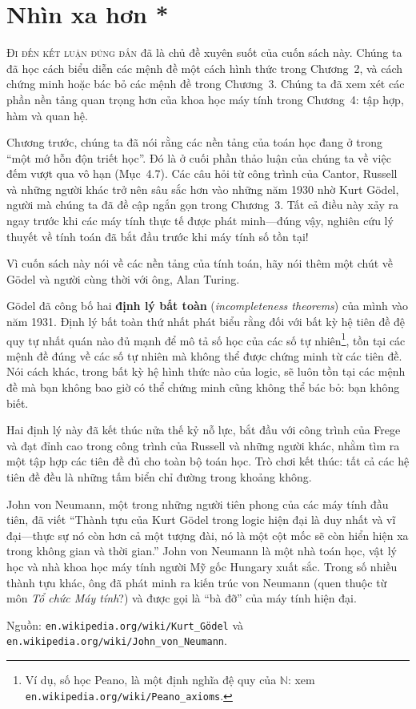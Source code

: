 \chapter{Nhìn xa hơn *}

\textsc{Đi đến kết luận đúng đắn} đã là chủ đề xuyên suốt của cuốn sách này. Chúng ta đã học cách biểu diễn các mệnh đề một cách hình thức trong Chương~2, và cách chứng minh hoặc bác bỏ các mệnh đề trong Chương~3. Chúng ta đã xem xét các phần nền tảng quan trọng hơn của khoa học máy tính trong Chương~4: tập hợp, hàm và quan hệ.

Chương trước, chúng ta đã nói rằng các nền tảng của toán học đang ở trong ``một mớ hỗn độn triết học''. Đó là ở cuối phần thảo luận của chúng ta về việc đếm vượt qua vô hạn (Mục~4.7). Các câu hỏi từ công trình của Cantor, Russell và những người khác trở nên sâu sắc hơn vào những năm 1930 nhờ Kurt Gödel, người mà chúng ta đã đề cập ngắn gọn trong Chương~3. Tất cả điều này xảy ra ngay trước khi các máy tính thực tế được phát minh---đúng vậy, nghiên cứu lý thuyết về tính toán đã bắt đầu trước khi máy tính số tồn tại!

Vì cuốn sách này nói về các nền tảng của tính toán, hãy nói thêm một chút về Gödel và người cùng thời với ông, Alan Turing.

Gödel đã công bố hai \textbf{định lý bất toàn} (\textit{incompleteness theorems}) của mình vào năm 1931. Định lý bất toàn thứ nhất phát biểu rằng đối với bất kỳ hệ tiên đề đệ quy tự nhất quán nào đủ mạnh để mô tả số học của các số tự nhiên\footnote{Ví dụ, số học Peano, là một định nghĩa đệ quy của $\mathbb{N}$: xem \texttt{en.wikipedia.org/wiki/Peano\_axioms}.}, tồn tại các mệnh đề đúng về các số tự nhiên mà không thể được chứng minh từ các tiên đề. Nói cách khác, trong bất kỳ hệ hình thức nào của logic, sẽ luôn tồn tại các mệnh đề mà bạn không bao giờ có thể chứng minh cũng không thể bác bỏ: bạn không biết.

Hai định lý này đã kết thúc nửa thế kỷ nỗ lực, bắt đầu với công trình của Frege và đạt đỉnh cao trong công trình của Russell và những người khác, nhằm tìm ra một tập hợp các tiên đề đủ cho toàn bộ toán học. Trò chơi kết thúc: tất cả các hệ tiên đề đều là những tấm biển chỉ đường trong khoảng không.

\begin{infobox}
John von Neumann, một trong những người tiên phong của các máy tính đầu tiên, đã viết ``Thành tựu của Kurt Gödel trong logic hiện đại là duy nhất và vĩ đại---thực sự nó còn hơn cả một tượng đài, nó là một cột mốc sẽ còn hiển hiện xa trong không gian và thời gian.'' John von Neumann là một nhà toán học, vật lý học và nhà khoa học máy tính người Mỹ gốc Hungary xuất sắc. Trong số nhiều thành tựu khác, ông đã phát minh ra kiến trúc von Neumann (quen thuộc từ môn \textit{Tổ chức Máy tính}?) và được gọi là ``bà đỡ'' của máy tính hiện đại.

\medskip
\noindent Nguồn: \texttt{en.wikipedia.org/wiki/Kurt\_Gödel} và \texttt{en.wikipedia.org/wiki/John\_von\_Neumann}.
\end{infobox}


